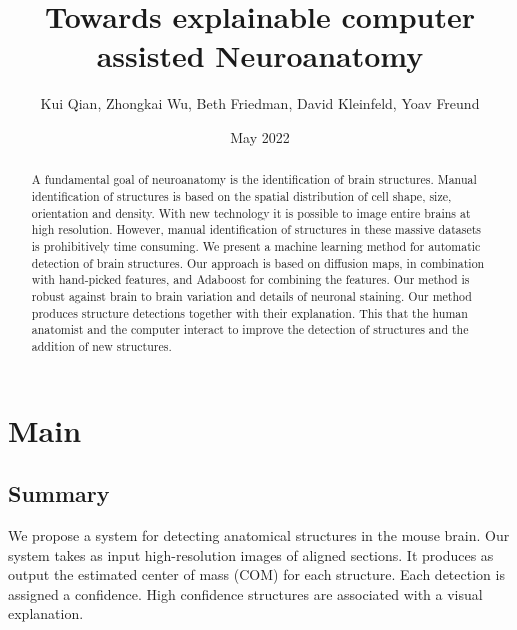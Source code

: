 \documentclass[runningheads]{llncs}
\title{Towards explainable computer assisted Neuroanatomy}
\author{Kui Qian, Zhongkai Wu, Beth Friedman, David Kleinfeld, Yoav Freund}
\date{May 2022}
\begin{document}
\maketitle

\begin{abstract}
  A fundamental goal of neuroanatomy is the identification of brain
  structures.  Manual identification of structures is based on the
  spatial distribution of cell shape, size, orientation and density.
  With new technology it is possible to image entire brains at high
  resolution.  However, manual identification of structures in these
  massive datasets is prohibitively time consuming.  We present a
  machine learning method for automatic detection of brain
  structures. Our approach is based on diffusion maps, in combination
  with hand-picked features, and Adaboost for combining the
  features. Our method is robust against brain to brain variation and
  details of neuronal staining.  Our method produces structure
  detections together with their explanation. This that the human
  anatomist and the computer interact to improve the detection of
  structures and the addition of new structures.
  
\end{abstract}

\section{Main}
\subsection{Summary}
We propose a system for detecting anatomical structures in the mouse brain. Our system takes as input high-resolution images of aligned sections. It produces as output the estimated center of mass (COM) for each structure. Each detection is assigned a confidence. High confidence structures are associated with a visual explanation.
\end{document}
